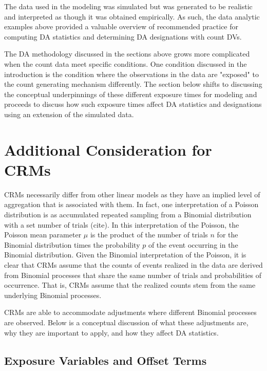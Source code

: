 \documentclass[ShortAfour,times,sageapa]{sagej}
\begin{document}
	The data used in the modeling was simulated but was generated to be realistic and interpreted as though it was obtained empirically.
	As such, the data analytic examples above provided a valuable overview of recommended practice for computing DA statistics and determining DA designations with count DVs.
	
	The DA methodology discussed in the sections above grows more complicated when the count data meet specific conditions. 
	One condition discussed in the introduction is the condition where the observations in the data are "exposed" to the count generating mechanism differently.
	The section below shifts to discussing the conceptual underpinnings of these different exposure times for modeling and proceeds to discuss how such exposure times affect DA statistics and designations using an extension of the simulated data.
	
\section{Additional Consideration for CRMs}

	CRMs necessarily differ from other linear models as they have an implied level of aggregation that is associated with them.
	In fact, one interpretation of a Poisson distribution is as accumulated repeated sampling from a Binomial distribution with a set number of trials (cite).
	In this interpretation of the Poisson, the Poisson mean parameter $\mu$ is the product of the number of trials $n$ for the Binomial distribution times the probability $p$ of the event occurring in the Binomial distribution.
	Given the Binomial interpretation of the Poisson, it is clear that CRMs assume that the counts of events realized in the data are derived from Binomial processes that share the same number of trials and probabilities of occurrence.
	That is, CRMs assume that the realized counts stem from the same underlying Binomial processes.
	
	CRMs are able to accommodate adjustments where different Binomial processes are observed. 
	Below is a conceptual discussion of what these adjustments are, why they are important to apply, and how they affect DA statistics.

	\subsection{Exposure Variables and Offset Terms}
	
\end{document}
